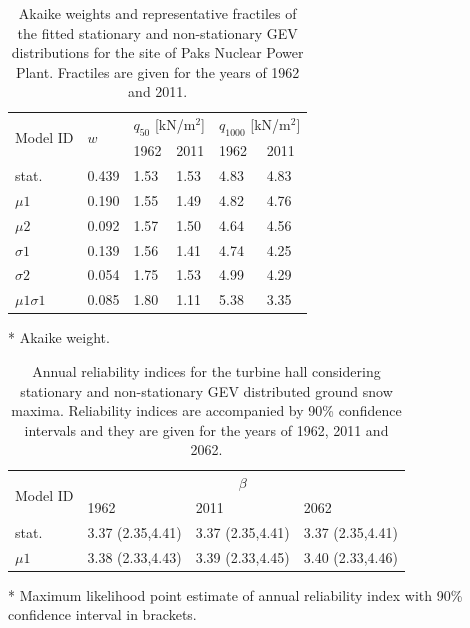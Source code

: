 \begin{table}[htbp!]
\caption{Akaike weights and representative fractiles of the fitted stationary and non-stationary GEV distributions for the site of Paks Nuclear Power Plant. Fractiles are given for the years of 1962 and 2011.}
\centering
\label{tab:nonstat_fit_paks}
\small
	\begin{threeparttable}
	    \begin{tabular}{llllll}
	    \toprule
	    \multirow{2}{*}{Model ID} & \multirow{2}{*}{$w$\tnote{*}} & \multicolumn{2}{l}{$q_{50}$ [kN/m$^2$]} & \multicolumn{2}{l}{$q_{1000}$ [kN/m$^2$]} \\
	     &  & 1962  & 2011 & 1962 & 2011 \\ 
	    \midrule
	    \rowcolor{lightgrey} stat.       & 0.439 & 1.53 & 1.53 & 4.83 & 4.83 \\
	    $\mu 1$                          & 0.190 & 1.55 & 1.49 & 4.82 & 4.76 \\
	    \rowcolor{lightgrey} $\mu 2$     & 0.092 & 1.57 & 1.50 & 4.64 & 4.56 \\
	    $\sigma 1$                       & 0.139 & 1.56 & 1.41 & 4.74 & 4.25 \\
	    \rowcolor{lightgrey} $\sigma 2$  & 0.054 & 1.75 & 1.53 & 4.99 & 4.29 \\
	    $\mu 1\sigma 1$                  & 0.085 & 1.80 & 1.11 & 5.38 & 3.35 \\
	    \bottomrule
	    \end{tabular}
    \begin{tablenotes}
        \item[*] Akaike weight.
    \end{tablenotes}
    \end{threeparttable}
\end{table}

\begin{table}[htbp!]
\caption{Annual reliability indices for the turbine hall considering stationary and non-stationary GEV distributed ground snow maxima. Reliability indices are accompanied by 90\% confidence intervals and they are given for the years of 1962, 2011 and 2062.}
\centering
\label{tab:nonstat_beta_paks}
\small
	\begin{threeparttable}
	    \begin{tabular}{llll}
	    \toprule
	    \multirow{2}{*}{Model ID} & \multicolumn{3}{c}{$\beta$\tnote{*}} \\
	     &  1962  & 2011 & 2062 \\ 
	    \midrule
	    \rowcolor{lightgrey} stat.  & 3.37 (2.35,4.41) & 3.37 (2.35,4.41) & 3.37 (2.35,4.41)  \\
	    $\mu 1$                     & 3.38 (2.33,4.43) & 3.39 (2.33,4.45) & 3.40 (2.33,4.46)  \\
	    \bottomrule
	    \end{tabular}
    \begin{tablenotes}
        \item[*] Maximum likelihood point estimate of annual reliability index with 90\% confidence interval in brackets.
    \end{tablenotes}
    \end{threeparttable}
\end{table}


